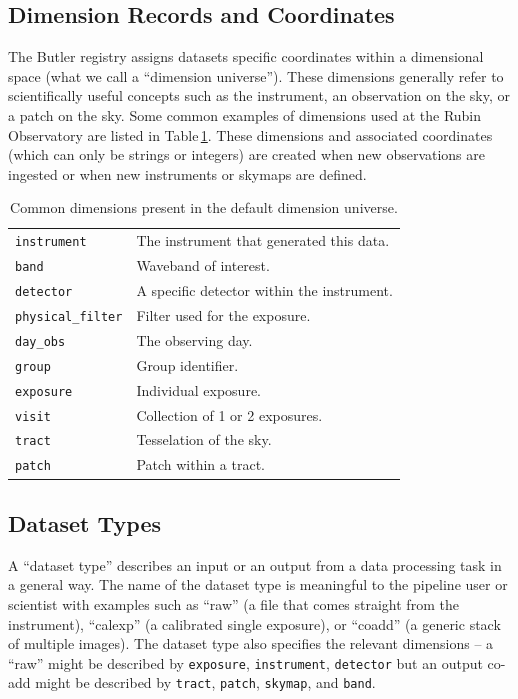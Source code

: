\subsection{Dimension Records and Coordinates}

The Butler registry assigns datasets specific coordinates within a dimensional space (what we call a ``dimension universe'').
These dimensions generally refer to scientifically useful concepts such as the instrument, an observation on the sky, or a patch on the sky.
Some common examples of dimensions used at the Rubin Observatory are listed in Table\,\ref{tab:dimensions}.
These dimensions and associated coordinates (which can only be strings or integers) are created when new observations are ingested or when new instruments or skymaps are defined.

\begin{table}
\begin{tabular}{ll}
\texttt{instrument} &  The instrument that generated this data. \\
\texttt{band} & Waveband of interest.  \\
\texttt{detector} & A specific detector within the instrument. \\
\texttt{physical\_filter} &  Filter used for the exposure. \\
\texttt{day\_obs} & The observing day. \\
\texttt{group} &  Group identifier. \\
\texttt{exposure} & Individual exposure. \\
\texttt{visit} &  Collection of 1 or 2 exposures. \\
\texttt{tract} &  Tesselation of the sky. \\
\texttt{patch} &  Patch within a tract.\\
\end{tabular}
\caption{Common dimensions present in the default dimension universe.}
\label{tab:dimensions}
\end{table}

\subsection{Dataset Types}

A ``dataset type'' describes an input or an output from a data processing task in a general way.
The name of the dataset type is meaningful to the pipeline user or scientist with examples such as ``raw'' (a file that comes straight from the instrument), ``calexp'' (a calibrated single exposure), or ``coadd'' (a generic stack of multiple images).
The dataset type also specifies the relevant dimensions -- a ``raw'' might be described by \texttt{exposure}, \texttt{instrument}, \texttt{detector} but an output co-add might be described by \texttt{tract}, \texttt{patch}, \texttt{skymap}, and \texttt{band}.

